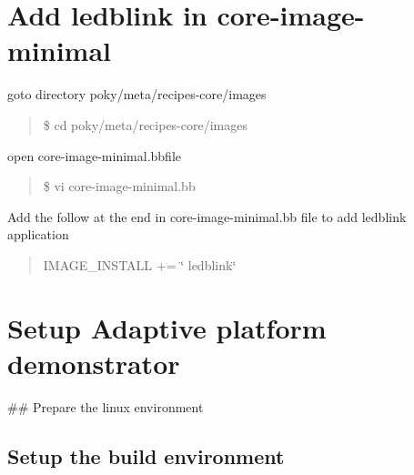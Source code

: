 \section*{Add ledblink in core-\/image-\/minimal}


\begin{DoxyItemize}
\item goto directory poky/meta/recipes-\/core/images \begin{quote}
\$ cd poky/meta/recipes-\/core/images \end{quote}

\item open core-\/image-\/minimal.\+bbfile \begin{quote}
\$ vi core-\/image-\/minimal.\+bb \end{quote}

\item Add the follow at the end in core-\/image-\/minimal.\+bb file to add ledblink application \begin{quote}
I\+M\+A\+G\+E\+\_\+\+I\+N\+S\+T\+A\+LL += \char`\"{} ledblink\char`\"{}\end{quote}

\end{DoxyItemize}\hypertarget{adaptive_application}{}\section{Setup Adaptive platform demonstrator}\label{adaptive_application}
\#\# Prepare the linux environment 


\subsection*{Setup the build environment}


